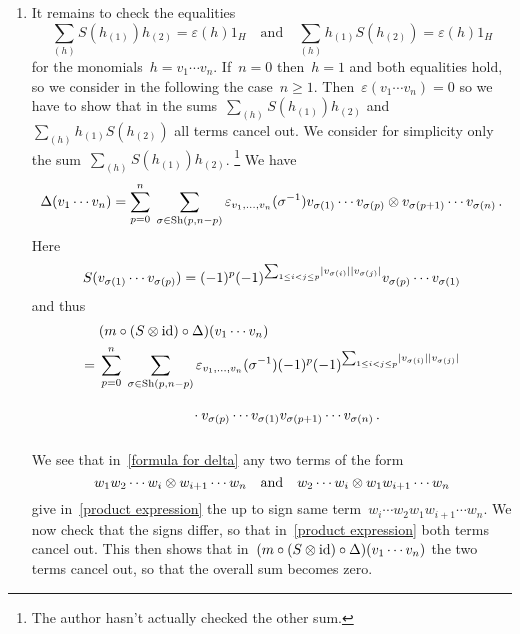 \documentclass[a4paper,10pt,headings=standardclasses]{scrartcl}
\begin{document}
\begin{enumerate}[start=2]
  \item
    It remains to check the equalities
    \[
      \sum_{(h)} S(h_{(1)}) h_{(2)}
      =
      \varepsilon(h) 1_H
      \quad
      \text{and}\quad
      \sum_{(h)} h_{(1)} S(h_{(2)})
      =
      \varepsilon(h) 1_H
    \]
    for the monomials~$h = v_1 \dotsm v_n$.
    If~$n = 0$ then~$h = 1$ and both equalities hold, so we consider in the following the case~$n \geq 1$.
    Then~$\varepsilon(v_1 \dotsm v_n) = 0$ so we have to show that in the sums~$\sum_{(h)} S(h_{(1)}) h_{(2)}$ and~$\sum_{(h)} h_{(1)} S(h_{(2)})$ all terms cancel out.
    We consider for simplicity only the sum~$\sum_{(h)} S(h_{(1)}) h_{(2)}$.%
    \footnote{The author hasn’t actually checked the other sum.}
    We have
    \begin{equation}
      \label{formula for delta}
      \Delta(v_1 \dotsm v_n)
      =
      \sum_{p=0}^n
      \;
      \sum_{\sigma \in \operatorname{Sh}(p,n-p)}
      \varepsilon_{v_1, \dotsc, v_n}(\sigma^{-1})
      v_{\sigma(1)} \dotsm v_{\sigma(p)} \otimes v_{\sigma(p+1)} \dotsm v_{\sigma(n)} \,.
    \end{equation}
    Here
    \[
      S(v_{\sigma(1)} \dotsm v_{\sigma(p)})
      =
      (-1)^p
      (-1)^{\sum_{1 \leq i < j \leq p} \lvert v_{\sigma(i)}\rvert \lvert v_{\sigma(j)}\rvert}
      v_{\sigma(p)} \dotsm v_{\sigma(1)}
    \]
    and thus
    \begin{align}
      {}&
      (m \circ (S \tensor {\id}) \circ \Delta)(v_1 \dotsm v_n)
      \notag
    \\
      ={}&
      \sum_{p=0}^n
      \;
      \sum_{\sigma \in \Sh(p,n-p)}
      \varepsilon_{v_1, \dotsc, v_n}(\sigma^{-1})
      (-1)^p
      (-1)^{\sum_{1 \leq i < j \leq p} \hdeg{v_{\sigma(i)}} \hdeg{v_{\sigma(j)}}}
      \notag
    \\
      {}&
      \phantom{\sum_{p=0}^n \; \sum_{\sigma \in \Sh(p,n-p)}}
      \cdot v_{\sigma(p)} \dotsm v_{\sigma(1)} v_{\sigma(p+1)} \dotsm v_{\sigma(n)} \,.
      \label{product expression}
    \end{align}
    We see that in~\eqref{formula for delta} any two terms of the form
    \[
      w_1 w_2 \dotsm w_i \otimes w_{i+1} \dotsm w_n
      \quad\text{and}\quad
      w_2 \dotsm w_i \otimes w_1 w_{i+1} \dotsm w_n
    \]
    give in~\eqref{product expression} the up to sign same term~$w_i \dotsm w_2 w_1 w_{i+1} \dotsm w_n$.
    We now check that the signs differ, so that in~\eqref{product expression} both terms cancel out.
    This then shows that in~$(m \circ (S \otimes {\operatorname{id}}) \circ \Delta)(v_1 \dotsm v_n)$ the two terms cancel out, so that the overall sum becomes zero.
    

\end{enumerate}
\end{document}
